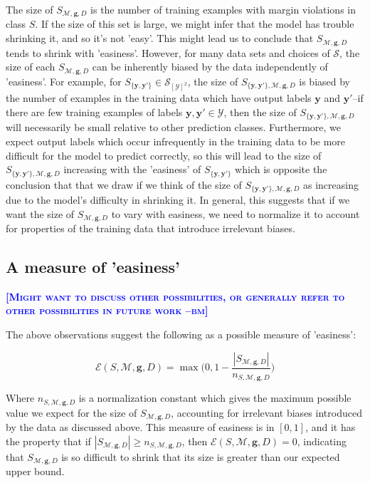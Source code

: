 \documentclass{article} %
\newcommand{\bmcomment}[1]{\textcolor{blue}{\textsc{\textbf{[#1 --bm]}}}}
\begin{document}
The size of $S_{\mathcal{M},\mathbf{g},D}$ is the number of
training examples with margin violations in class $S$. If
the size of this set is large, we might infer that the
model has trouble shrinking it, and so it's not 'easy'.  This 
might lead us to conclude that $S_{\mathcal{M},\mathbf{g},D}$ 
tends to shrink with 'easiness'.  However,
for many data sets and choices of $\mathcal{S}$, the size 
of each $S_{\mathcal{M},\mathbf{g},D}$ can be inherently
biased by the data independently of 'easiness'.  For example, 
for $S_{\{\mathbf{y},\mathbf{y}'\}}\in\mathcal{S}_{[\mathcal{Y}]^2}$, 
the size of $S_{\{\mathbf{y},\mathbf{y}'\},\mathcal{M},\mathbf{g},D}$ 
is biased by the number of examples in the training data which have 
output labels $\mathbf{y}$ and $\mathbf{y}'$--if there are few 
training examples of labels 
$\mathbf{y},\mathbf{y}'\in\mathcal{Y}$, then the size of 
$S_{\{\mathbf{y}, \mathbf{y}'\},\mathcal{M},\mathbf{g},D}$ 
will necessarily be small relative to other prediction classes.
Furthermore, we expect 
output labels which occur infrequently in the training data to 
be more difficult for the model to predict correctly, so this
will lead to the size of 
$S_{\{\mathbf{y},\mathbf{y}'\},\mathcal{M},\mathbf{g},D}$ 
increasing with the 'easiness' of 
$S_{\{\mathbf{y},\mathbf{y}'\}}$ which is opposite the 
conclusion that that we draw if we think of the size of 
$S_{\{\mathbf{y},\mathbf{y}'\},\mathcal{M},\mathbf{g},D}$ as
increasing due to the model's difficulty in shrinking it.  In general, 
this suggests that if we want the size of $S_{\mathcal{M},\mathbf{g},D}$
to vary with easiness, we need to normalize it to account for 
properties of the training data that introduce irrelevant
biases.  

\subsection{A measure of 'easiness'}

\bmcomment{Might want to discuss other possibilities, or generally
refer to other possibilities in future work}

The above observations suggest the following as a possible 
measure of 'easiness':

\begin{equation}
\label{easiness}
\mathcal{E}(S,\mathcal{M},\mathbf{g},D)=\max\bigg(0, 1-\frac{|S_{\mathcal{M},\mathbf{g},D}|}{n_{S,\mathcal{M},\mathbf{g},D}}\bigg)
\end{equation}

Where $n_{S,\mathcal{M},\mathbf{g},D}$ is a normalization constant which
gives the maximum possible value we expect for the size of 
$S_{\mathcal{M},\mathbf{g},D}$, accounting for irrelevant biases
introduced by the data as discussed above.  This measure of easiness 
is in $[0,1]$, and it has the property that if 
$|S_{\mathcal{M},\mathbf{g},D}|\geq n_{S,\mathcal{M},\mathbf{g},D}$,
then $\mathcal{E}(S,\mathcal{M},\mathbf{g},D)=0$, indicating that
$S_{\mathcal{M},\mathbf{g},D}$ is so difficult to shrink that its
size is greater than our expected upper bound.
\end{document}
